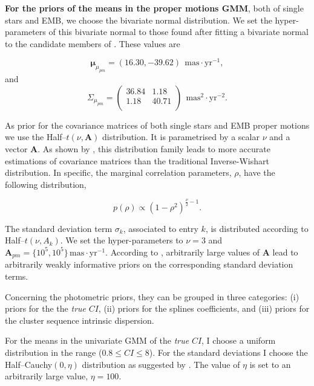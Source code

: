 \textbf{For the priors of the  means in the proper motions GMM}, both of single stars and EMB, we choose the bivariate normal distribution. We set the hyper-parameters of this bivariate normal to those found after fitting a bivariate normal to the candidate members of \citet{Bouy2015}. These values are

\begin{equation}
\boldsymbol{\mu}_{\mu_{pm}}=(16.30,-39.62) \ \ \mathrm{mas\cdot yr^{-1}},\nonumber
 \end{equation}
 and
 \begin{equation}
\Sigma_{\mu_{pm}} = \left( 
\begin{array}{cc}
36.84&1.18 \\
1.18&40.71\\
\end{array} \right)\ \ \mathrm{mas^2\cdot yr^{-2}}.\nonumber
\end{equation}


As prior for the covariance matrices of both single stars and EMB proper motions we use the Half--$t(\nu,\mathbf{A})$ distribution. It is parametrised by a scalar $\nu$ and a vector $\mathbf{A}$. As shown by \citet{Huang2013}, this distribution family leads to more accurate estimations of covariance matrices than the traditional Inverse-Wishart distribution. In specific, the marginal correlation parameters, $\rho$, have the following distribution,

\begin{equation}
p(\rho) \propto (1-\rho^2)^{\frac{\nu}{2}-1}.
\end{equation}

The standard deviation term $\sigma_k$, associated to entry $k$, is distributed according to Half--$t(\nu,A_k)$. We set the hyper-parameters to $\nu=3$ and $\boldsymbol{A}_{pm}=\{10^5,10^5\}\,\mathrm{mas\cdot yr^{-1}}$. According to \citet{Huang2013}, arbitrarily large values of $\boldsymbol{A}$ lead to arbitrarily weakly informative priors on the corresponding standard deviation terms.

Concerning the photometric priors, they can be grouped in three categories: (i) priors for the the \emph{true} $CI$, (ii) priors for the splines coefficients, and (iii) priors for the cluster sequence intrinsic dispersion. 

For the means in the univariate GMM of the \emph{true} $CI$, I choose a uniform distribution in the range  ($0.8\leq CI \leq8$). For the standard deviations I choose the Half--Cauchy$(0,\eta)$ distribution as suggested by \citet{Gelman2006}. The value of $\eta$ is set to an arbitrarily large value, $\eta=100$.

